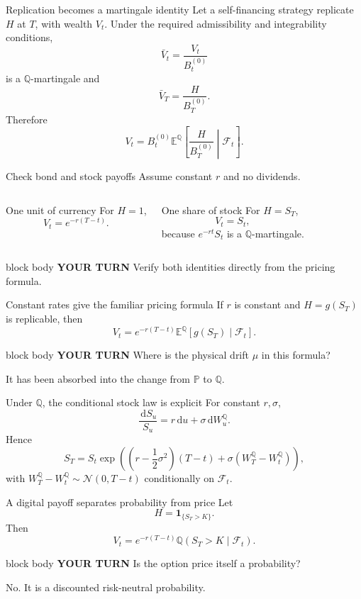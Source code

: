 \documentclass[handout,10pt,aspectratio=169]{beamer}
\newenvironment{pausebox}{\begin{beamercolorbox}[rounded=true,sep=0.8em,wd=\textwidth]{block body}
  \textbf{\color{CourseGold}YOUR TURN}\quad}{\end{beamercolorbox}}
\newcommand{\dd}{\,\mathrm d}
\newcommand{\E}{\mathbb E}
\newcommand{\Pp}{\mathbb P}
\newcommand{\Q}{\mathbb Q}
\newcommand{\cF}{\mathcal F}
\newcommand{\1}{\mathbf 1}
\newcommand{\Nlaw}{\mathcal N}
\begin{document}
\begin{frame}{Replication becomes a martingale identity}
Let a self-financing strategy replicate \(H\) at \(T\), with wealth \(V_t\).
Under the required admissibility and integrability conditions,
\[
\bar V_t=\frac{V_t}{B_t^{(0)}}
\]
is a \(\Q\)-martingale and
\[
\bar V_T=\frac{H}{B_T^{(0)}}.
\]
Therefore
\[
\boxed{
V_t=B_t^{(0)}
\E^\Q\!\left[\frac{H}{B_T^{(0)}}\middle|\cF_t\right].}
\]
\end{frame}

\begin{frame}{Check bond and stock payoffs}
Assume constant \(r\) and no dividends.
\begin{columns}[T,onlytextwidth]
\begin{block}{One unit of currency}
For \(H=1\),
\[
V_t=e^{-r(T-t)}.
\]
\end{block}
\begin{exampleblock}{One share of stock}
For \(H=S_T\),
\[
V_t=S_t,
\]
because \(e^{-rt}S_t\) is a \(\Q\)-martingale.
\end{exampleblock}
\end{columns}
\begin{pausebox}
Verify both identities directly from the pricing formula.
\end{pausebox}
\end{frame}

\begin{frame}{Constant rates give the familiar pricing formula}
If \(r\) is constant and \(H=g(S_T)\) is replicable, then
\[
\boxed{
V_t=e^{-r(T-t)}
\E^\Q[g(S_T)\mid\cF_t].}
\]
\begin{pausebox}
Where is the physical drift \(\mu\) in this formula?
\end{pausebox}

It has been absorbed into the change from \(\Pp\) to \(\Q\).
\end{frame}

\begin{frame}{Under \(\Q\), the conditional stock law is explicit}
For constant \(r,\sigma\),
\[
\frac{\dd S_u}{S_u}=r\dd u+\sigma\dd W_u^\Q.
\]
Hence
\[
S_T=S_t\exp\!\left(
\left(r-\frac12\sigma^2\right)(T-t)
+\sigma(W_T^\Q-W_t^\Q)
\right),
\]
with \(W_T^\Q-W_t^\Q\sim\Nlaw(0,T-t)\) conditionally on \(\cF_t\).
\end{frame}

\begin{frame}{A digital payoff separates probability from price}
Let
\[
H=\1_{\{S_T>K\}}.
\]
Then
\[
V_t=e^{-r(T-t)}\Q(S_T>K\mid\cF_t).
\]
\begin{pausebox}
Is the option price itself a probability?
\end{pausebox}

No. It is a discounted risk-neutral probability.
\end{frame}
\end{document}
